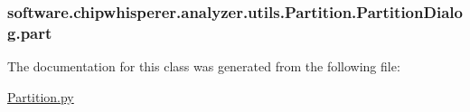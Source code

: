 \subsubsection[{part}]{\setlength{\rightskip}{0pt plus 5cm}software.\+chipwhisperer.\+analyzer.\+utils.\+Partition.\+Partition\+Dialog.\+part}\label{classsoftware_1_1chipwhisperer_1_1analyzer_1_1utils_1_1Partition_1_1PartitionDialog_a5b9489ab794a053397b9bfccbdbdf74f}


The documentation for this class was generated from the following file\+:\begin{DoxyCompactItemize}
\item 
\hyperlink{Partition_8py}{Partition.\+py}\end{DoxyCompactItemize}
